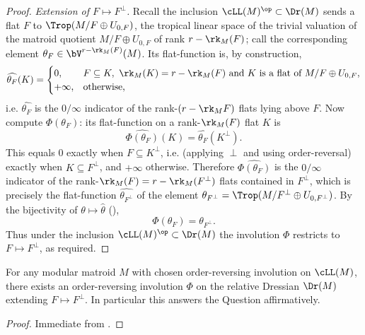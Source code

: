 \begin{proof}
\emph{Extension of $F\mapsto F^\perp$.}
Recall the inclusion $\cLL(M)^{\op}\subset\Dr(M)$ sends a flat $F$ to
$\Trop(M/F\oplus U_{0,F})$, the tropical linear space of the trivial valuation of
the matroid quotient $M/F\oplus U_{0,F}$ of rank $r-\rk_M(F)$; call the
corresponding element $\theta_F\in\bV^{r-\rk_M(F)}(M)$. Its flat-function is, by
construction,
\[
\widehat{\theta_F}(K)=
\begin{cases}
0,& F\subseteq K,\ \rk_M(K)=r-\rk_M(F)\ \text{and } K \text{ is a flat of } M/F\oplus U_{0,F},\\
+\infty,& \text{otherwise,}
\end{cases}
\]
i.e. $\widehat{\theta_F}$ is the $0/\infty$ indicator of the rank-$(r-\rk_M F)$
flats lying above $F$. Now compute $\Phi(\theta_F)$: its flat-function on a
rank-$\rk_M(F)$ flat $K$ is
\[
\widehat{\Phi(\theta_F)}(K)=\widehat{\theta_F}(K^\perp).
\]
This equals $0$ exactly when $F\subseteq K^\perp$, i.e. (applying $\perp$ and
using order-reversal) exactly when $K\subseteq F^\perp$, and $+\infty$
otherwise. Therefore $\widehat{\Phi(\theta_F)}$ is the $0/\infty$ indicator of
the rank-$\rk_M(F)=r-\rk_M(F^\perp)$ flats contained in $F^\perp$, which is
precisely the flat-function $\widehat{\theta_{F^\perp}}$ of the element
$\theta_{F^\perp}=\Trop(M/F^\perp\oplus U_{0,F^\perp})$. By the bijectivity of
$\theta\mapsto\widehat\theta$ (),
\[
\Phi(\theta_F)=\theta_{F^\perp}.
\]
Thus under the inclusion $\cLL(M)^{\op}\subset\Dr(M)$ the involution $\Phi$
restricts to $F\mapsto F^\perp$, as required.
\end{proof}

\begin{corollary}
For any modular matroid $M$ with chosen order-reversing involution on
$\cLL(M)$, there exists an order-reversing involution $\Phi$ on the relative
Dressian $\Dr(M)$ extending $F\mapsto F^\perp$. In particular this answers the
Question affirmatively.
\end{corollary}

\begin{proof}
Immediate from .
\end{proof}